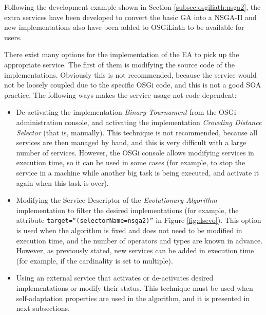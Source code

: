 Following the development example shown in Section \ref{subsec:osgiliath:nsga2},
the extra services have been developed to convert the basic GA into a
NSGA-II and new implementations also have been added to OSGiLiath to be available for
users. %

There exist many options for the implementation of the EA to pick up the appropriate
service. %
 The first of them is modifying the source code of the
 implementations. Obviously this is not recommended, because the
 service would not be loosely coupled due to the specific OSGi code,
 and this is not a good SOA practice. The following ways makes the
 service usage not code-dependent: 


\begin{itemize}
\item De-activating the implementation {\em Binary Tournament} from the OSGi administration console, and activating the implementation {\em Crowding Distance Selector} (that is, manually). This technique is not recommended, because all services are then managed by hand, and this is very difficult with a large number of services. However, the OSGi console allows modifying services in execution time, so it can be used in some cases (for example, to stop the service in a machine while another big task is being executed, and activate it again when this task is over).
\item Modifying the Service Descriptor of the {\em Evolutionary Algorithm} implementation to filter the desired implementations (for example, the attribute \texttt{target\-=``(selectorName\-=nsga2)''} in Figure \ref{fig:dsevo}). This option is used when the algorithm is fixed and does not need to be modified in execution time, and the number of operators and types are known in advance. However, as previously stated, new services can be added in execution time (for example, if the cardinality is set to multiple).
\item Using an external service that activates or de-activates desired implementations or modify their status. This technique must be used when self-adaptation properties are used in the algorithm, and it is presented in next subsections. 
\end{itemize}


